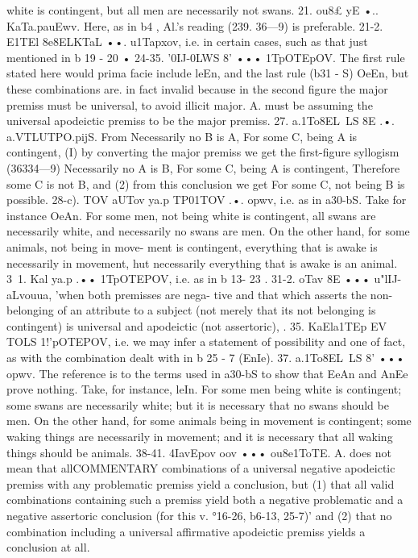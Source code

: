 {{{{{{{{{white is contingent, but all men are necessarily not swans.
21. ou8£ yE •.. KaTa.pauEwv. Here, as in b4 , Al.'s reading (239.
36---9) is preferable.
21-2. E1TEl 8e8ELKTaL ••. u1Tapxov, i.e. in certain cases, such as
that just mentioned in b 19 - 20 •
24-35. '0IJ-0LWS 8' ••• 1TpOTEpOV. The first rule stated here
would prima facie include leEn, and the last rule (b31 - S) OeEn, but
these combinations are. in fact invalid because in the second figure
the major premiss must be universal, to avoid illicit major.
A. must be assuming the universal apodeictic premiss to be the
major premiss.
27. a.1To8EL~LS 8E .•. a.VTLUTPO.pijS. From Necessarily no B is
A, For some C, being A is contingent, (I) by converting the major
premiss we get the first-figure syllogism (36334---9) Necessarily no
A is B, For some C, being A is contingent, Therefore some C is
not B, and (2) from this conclusion we get For some C, not being
B is possible.
28-c). TOV aUTov ya.p TP01TOV .•. opwv, i.e. as in a30-bS. Take
for instance OeAn. For some men, not being white is contingent,
all swans are necessarily white, and necessarily no swans are
men. On the other hand, for some animals, not being in move-
ment is contingent, everything that is awake is necessarily in
movement, hut necessarily everything that is awake is an animal.
3~1. Kal ya.p .•• 1TpOTEPOV, i.e. as in b 13- 23 .
31-2. oTav 8E ••• u"lIJ-aLvouua, 'when both premisses are nega-
tive and that which asserts the non-belonging of an attribute to
a subject (not merely that its not belonging is contingent) is
universal and apodeictic (not assertoric), .
35. KaEla1TEp EV TOLS 1!'pOTEPOV, i.e. we may infer a statement of
possibility and one of fact, as with the combination dealt with in
b 25 - 7 (EnIe).
37. a.1To8EL~LS 8' ••• opwv. The reference is to the terms used
in a30-bS to show that EeAn and AnEe prove nothing. Take, for
instance, leIn. For some men being white is contingent; some
swans are necessarily white; but it is necessary that no swans
should be men. On the other hand, for some animals being in
movement is contingent; some waking things are necessarily in
movement; and it is necessary that all waking things should be
animals.
38-41. 4IavEpov oov ••• ou8e1ToTE. A. does not mean that allCOMMENTARY
combinations of a universal negative apodeictic premiss with any
problematic premiss yield a conclusion, but (1) that all valid
combinations containing such a premiss yield both a negative
problematic and a negative assertoric conclusion (for this v.
°16-26, b6-13, 25-7)' and (2) that no combination including a
universal affirmative apodeictic premiss yields a conclusion at all.
}}}}}}}}}
